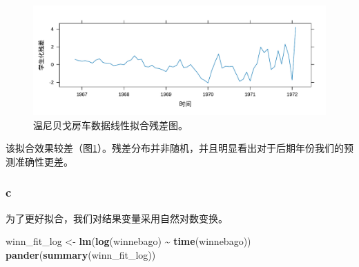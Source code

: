 \documentclass[
]{article}
\newenvironment{Shaded}{\begin{snugshade}}{\end{snugshade}}
\newcommand{\FunctionTok}[1]{\textcolor[rgb]{0.13,0.29,0.53}{\textbf{#1}}}
\newcommand{\NormalTok}[1]{#1}
\newcommand{\OtherTok}[1]{\textcolor[rgb]{0.56,0.35,0.01}{#1}}
\newcommand{\SpecialCharTok}[1]{\textcolor[rgb]{0.81,0.36,0.00}{\textbf{#1}}}
\begin{document}
\begin{figure}
\centering
\includegraphics{chapter3_files/figure-latex/winnebago-lm-res-1.pdf}
\caption{\label{fig:winnebago-lm-res}温尼贝戈房车数据线性拟合残差图。}
\end{figure}

该拟合效果较差（图\ref{fig:winnebago-lm-res}）。残差分布并非随机，并且明显看出对于后期年份我们的预测准确性更差。

\hypertarget{c-2}{%
\subsubsection*{c}\label{c-2}}

为了更好拟合，我们对结果变量采用自然对数变换。

\begin{Shaded}
\begin{Highlighting}[]
\NormalTok{winn\_fit\_log }\OtherTok{\textless{}{-}} \FunctionTok{lm}\NormalTok{(}\FunctionTok{log}\NormalTok{(winnebago) }\SpecialCharTok{\textasciitilde{}} \FunctionTok{time}\NormalTok{(winnebago))}
\FunctionTok{pander}\NormalTok{(}\FunctionTok{summary}\NormalTok{(winn\_fit\_log))}
\end{Highlighting}
\end{Shaded}
\end{document}
